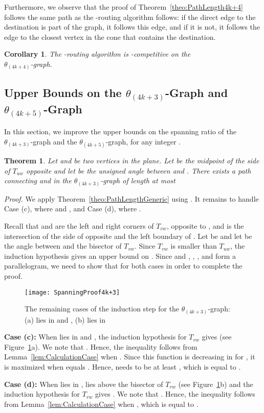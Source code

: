 \documentclass[12pt]{article}
\newtheorem{theo}[defin]{Theorem}
\newenvironment{theorem}{\begin{theo} \sl}{\end{theo}}
\newtheorem{coro}[defin]{Corollary}
\newenvironment{corollary}{\begin{coro} \sl}{\end{coro}}
\newenvironment{proof}{\emph{Proof.}}{\hfill \\}
\newcommand{\Graph}[1]{\ensuremath{\theta_{(4 k + #1)}}-Graph\xspace}
\newcommand{\graph}[1]{\ensuremath{\theta_{(4 k + #1)}}-graph\xspace}
\newcommand{\canon}[2]{\ensuremath{T_{#1 #2}}}
\begin{document}
Furthermore, we observe that the proof of Theorem~\ref{theo:PathLength4k+4} follows the same path as the -routing algorithm follows: if the direct edge to the destination is part of the graph, it follows this edge, and if it is not, it follows the edge to the closest vertex in the cone that contains the destination. 

\begin{corollary}
  \label{cor:Routing4k+4}
  The -routing algorithm is -competitive on the \\ \graph{4}. 
\end{corollary}


\subsection{Upper Bounds on the \Graph{3} and \Graph{5}}
\label{subsec:Theta4k+35}
In this section, we improve the upper bounds on the spanning ratio of the \graph{3} and the \graph{5}, for any integer . 

\begin{theorem}
  \label{theo:PathLength4k+3}
  Let  and  be two vertices in the plane. Let  be the midpoint of the side of \canon{u}{w} opposite  and let  be the unsigned angle between  and . There exists a path connecting  and  in the \graph{3} of length at most 
   
\end{theorem}
\begin{proof}
  We apply Theorem~\ref{theo:PathLengthGeneric} using . It remains to handle Case (c), where  and , and Case (d), where . 

  Recall that  and  are the left and right corners of \canon{v}{w}, opposite to , and  is the intersection of the side of  opposite  and the left boundary of . Let  be  and let  be the angle between  and the bisector of \canon{v}{w}. Since \canon{v}{w} is smaller than \canon{u}{w}, the induction hypothesis gives an upper bound on . Since  and , , , and  form a parallelogram, we need to show that  for both cases in order to complete the proof. 

  \begin{figure}[ht]
    \begin{center}
      \texttt{[image: SpanningProof4k+3]}
    \end{center}
    \caption{The remaining cases of the induction step for the \graph{3}: (a)  lies in  and , (b)  lies in }
    \label{fig:SpanningProof4k+3}
  \end{figure}

  \textbf{Case (c):} When  lies in  and , the induction hypothesis for \canon{v}{w} gives  (see Figure~\ref{fig:SpanningProof4k+3}a). We note that . Hence, the inequality follows from Lemma~\ref{lem:CalculationCase} when . Since this function is decreasing in  for , it is maximized when  equals . Hence,  needs to be at least , which is equal to . 

  \textbf{Case (d):} When  lies in ,  lies above the bisector of \canon{v}{w} (see Figure~\ref{fig:SpanningProof4k+3}b) and the induction hypothesis for \canon{v}{w} gives . We note that . Hence, the inequality follows from Lemma~\ref{lem:CalculationCase} when , which is equal to . 
\end{proof}
\end{document}
